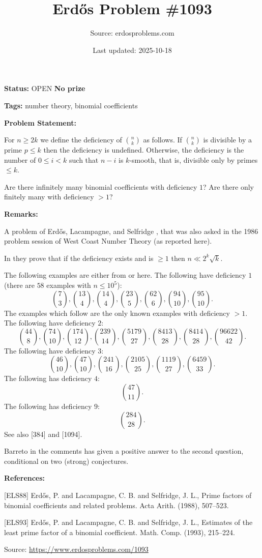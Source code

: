 \documentclass{article}
\title{Erd\H{o}s Problem \#1093}
\date{Last updated: 2025-10-18}
\author{Source: erdosproblems.com}
\begin{document}
\maketitle

\noindent\textbf{Status:} OPEN \quad \textbf{No prize}

\noindent\textbf{Tags:} number theory, binomial coefficients

\medskip
\noindent\textbf{Problem Statement:}

For $n\geq 2k$ we define the deficiency of $\binom{n}{k}$ as follows. If $\binom{n}{k}$ is divisible by a prime $p\leq k$ then the deficiency is undefined. Otherwise, the deficiency is the number of $0\leq i<k$ such that $n-i$ is $k$-smooth, that is, divisible only by primes $\leq k$. 

Are there infinitely many binomial coefficients with deficiency $1$? Are there only finitely many with deficiency $>1$?

\bigskip
\noindent\textbf{Remarks:}

A problem of Erd\H{o}s, Lacampagne, and Selfridge \cite{ELS88}, that was also asked in the 1986 problem session of West Coast Number Theory (as reported here).

In \cite{ELS93} they prove that if the deficiency exists and is $\geq 1$ then $n\ll 2^k\sqrt{k}$. 

The following examples are either from \cite{ELS88} or here. The following have deficiency $1$ (there are $58$ examples with $n\leq 10^5$):\[\binom{7}{3},\binom{13}{4},\binom{14}{4},\binom{23}{5},\binom{62}{6},\binom{94}{10},\binom{95}{10}.\]The examples which follow are the only known examples with deficiency $>1$. The following have deficiency $2$:\[\binom{44}{8},\binom{74}{10},\binom{174}{12},\binom{239}{14},\binom{5179}{27},\binom{8413}{28},\binom{8414}{28},\binom{96622}{42}.\]The following have deficiency $3$:\[\binom{46}{10},\binom{47}{10},\binom{241}{16},\binom{2105}{25},\binom{1119}{27},\binom{6459}{33}.\]The following has deficiency $4$:\[\binom{47}{11}.\]The following has deficiency $9$:\[\binom{284}{28}.\]See also [384] and [1094].

Barreto in the comments has given a positive answer to the second question, conditional on two (strong) conjectures.

\bigskip
\noindent\textbf{References:}

[ELS88] Erd\H{o}s, P. and Lacampagne, C. B. and Selfridge, J. L., Prime factors of binomial coefficients and related problems. Acta Arith. (1988), 507--523.
 
 [ELS93] Erd\H{o}s, P. and Lacampagne, C. B. and Selfridge, J. L., Estimates of the least prime factor of a binomial coefficient. Math. Comp. (1993), 215--224.

\bigskip
\noindent\small{Source: \url{https://www.erdosproblems.com/1093}}
\end{document}
